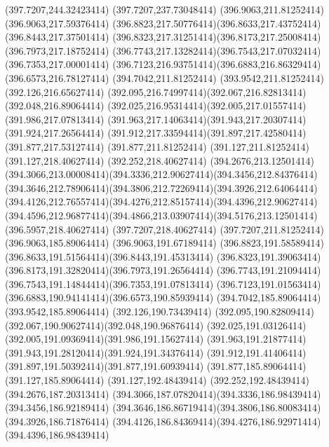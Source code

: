 {{	\lineto(397.7207,244.32423414)
	\lineto(397.7207,237.73048414)
	\closepath
	\moveto(396.9063,211.81252414)
	\lineto(396.9063,217.59376414)
	\curveto(396.8823,217.50776414)(396.8633,217.43752414)(396.8443,217.37501414)
	\curveto(396.8323,217.31251414)(396.8173,217.25008414)(396.7973,217.18752414)
	\curveto(396.7743,217.13282414)(396.7543,217.07032414)(396.7353,217.00001414)
	\curveto(396.7123,216.93751414)(396.6883,216.86329414)(396.6573,216.78127414)
	\lineto(394.7042,211.81252414)
	\lineto(393.9542,211.81252414)
	\lineto(392.126,216.65627414)
	\curveto(392.095,216.74997414)(392.067,216.82813414)(392.048,216.89064414)
	\curveto(392.025,216.95314414)(392.005,217.01557414)(391.986,217.07813414)
	\curveto(391.963,217.14063414)(391.943,217.20307414)(391.924,217.26564414)
	\curveto(391.912,217.33594414)(391.897,217.42580414)(391.877,217.53127414)
	\lineto(391.877,211.81252414)
	\lineto(391.127,211.81252414)
	\lineto(391.127,218.40627414)
	\lineto(392.252,218.40627414)
	\lineto(394.2676,213.12501414)
	\curveto(394.3066,213.00008414)(394.3336,212.90627414)(394.3456,212.84376414)
	\curveto(394.3646,212.78906414)(394.3806,212.72269414)(394.3926,212.64064414)
	\curveto(394.4126,212.76557414)(394.4276,212.85157414)(394.4396,212.90627414)
	\curveto(394.4596,212.96877414)(394.4866,213.03907414)(394.5176,213.12501414)
	\lineto(396.5957,218.40627414)
	\lineto(397.7207,218.40627414)
	\lineto(397.7207,211.81252414)
	\closepath
	\moveto(396.9063,185.89064414)
	\lineto(396.9063,191.67189414)
	\curveto(396.8823,191.58589414)(396.8633,191.51564414)(396.8443,191.45313414)
	\curveto(396.8323,191.39063414)(396.8173,191.32820414)(396.7973,191.26564414)
	\curveto(396.7743,191.21094414)(396.7543,191.14844414)(396.7353,191.07813414)
	\curveto(396.7123,191.01563414)(396.6883,190.94141414)(396.6573,190.85939414)
	\lineto(394.7042,185.89064414)
	\lineto(393.9542,185.89064414)
	\lineto(392.126,190.73439414)
	\curveto(392.095,190.82809414)(392.067,190.90627414)(392.048,190.96876414)
	\curveto(392.025,191.03126414)(392.005,191.09369414)(391.986,191.15627414)
	\curveto(391.963,191.21877414)(391.943,191.28120414)(391.924,191.34376414)
	\curveto(391.912,191.41406414)(391.897,191.50392414)(391.877,191.60939414)
	\lineto(391.877,185.89064414)
	\lineto(391.127,185.89064414)
	\lineto(391.127,192.48439414)
	\lineto(392.252,192.48439414)
	\lineto(394.2676,187.20313414)
	\curveto(394.3066,187.07820414)(394.3336,186.98439414)(394.3456,186.92189414)
	\curveto(394.3646,186.86719414)(394.3806,186.80083414)(394.3926,186.71876414)
	\curveto(394.4126,186.84369414)(394.4276,186.92971414)(394.4396,186.98439414)
}}

